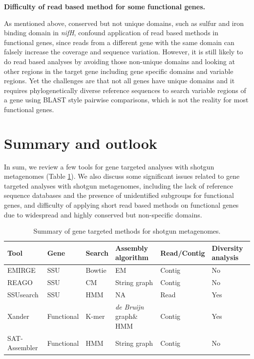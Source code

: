 \documentclass[]{msu-thesis}
\begin{document}
\textbf{Difficulty of read based method for some functional genes.}

As mentioned above, conserved but not unique domains, such as
sulfur and iron binding domain in \textit{nifH}, confound application
of read based methods in functional genes, since reads from a different
gene with the same domain can falsely increase the coverage
and sequence variation. However, it is still likely to do read based
analyses by avoiding those non-unique domains and looking
at other regions in the target gene including gene specific domains and
variable regions. Yet the challenges are that not all genes have unique
domains and it requires phylogenetically diverse reference sequences to
search variable regions of a gene using BLAST style pairwise
comparisons, which is not the reality for most functional genes.

\section{Summary and outlook}

In sum, we review a few tools for gene targeted analyses with shotgun
metagenomes (Table \ref{tab:toolSumm}). We also discuss some
significant issues related to gene targeted analyses with shotgun
metagenomes, including the lack of reference sequence databases and
the presence of unidentified subgroups for functional genes, and
difficulty of applying short read based methods on functional genes
due to widespread and highly conserved but non-specific domains.

\begin{table}[htbp]
  \centering
  \caption[Summary of gene targeted methods for shotgun metagenomes]{Summary of gene targeted methods for shotgun metagenomes.}
    \begin{tabular}{|llllll|}
    \toprule
    Tool  & Gene & Search & Assembly algorithm & Read/Contig & Diversity analysis \\
    \midrule
    EMIRGE & SSU & Bowtie & EM    & Contig & No \\
    REAGO & SSU & CM    & String graph & Contig & No \\
    SSUsearch & SSU & HMM   & NA    & Read  & Yes \\
    Xander & Functional & K-mer & \textit{de Bruijn} graph\& HMM & Contig & Yes \\
    SAT-Assembler & Functional & HMM   & String graph & Contig & No \\
    \bottomrule
    \end{tabular}%
  \label{tab:toolSumm}%
\end{table}%
\end{document}
